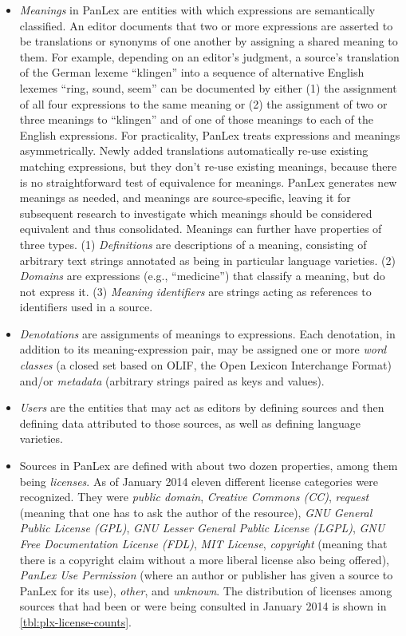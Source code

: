 \documentclass[sw]{iosart2c}
\begin{document}
\begin{itemize}
    \item \emph{Meanings} in PanLex are entities with which expressions are semantically classified. An editor documents that two or more expressions are asserted to be translations or synonyms of one another by assigning a shared meaning to them. For example, depending on an editor's judgment, a source's translation of the German lexeme ``klingen'' into a sequence of alternative English lexemes ``ring, sound, seem'' can be documented by either (1) the assignment of all four expressions to the same meaning or (2) the assignment of two or three meanings to ``klingen'' and of one of those meanings to each of the English expressions. For practicality, PanLex treats expressions and meanings asymmetrically. Newly added translations automatically re-use existing matching expressions, but they don't re-use existing meanings, because there is no straightforward test of equivalence for meanings. PanLex generates new meanings as needed, and meanings are source-specific, leaving it for subsequent research to investigate which meanings should be considered equivalent and thus consolidated. Meanings can further have properties of three types. (1) \emph{Definitions} are descriptions of a meaning, consisting of arbitrary text strings annotated as being in particular language varieties. (2) \emph{Domains} are expressions (e.g., ``medicine'') that classify a meaning, but do not express it. (3) \emph{Meaning identifiers} are strings acting as references to identifiers used in a source.
    \item \emph{Denotations} are assignments of meanings to expressions. Each denotation, in addition to its meaning-expression pair, may be assigned one or more \emph{word classes} (a closed set based on OLIF, the Open Lexicon Interchange Format) and/or \emph{metadata} (arbitrary strings paired as keys and values).
  \item \emph{Users} are the entities that may act as editors by defining sources and then defining data attributed to those sources, as well as defining language varieties.
  \item Sources in PanLex are defined with about two dozen properties, among them being \emph{licenses}. As of January 2014 eleven different license categories were recognized. They were \emph{public domain}, \emph{Creative Commons (CC)}, \emph{request} (meaning that one has to ask the author of the resource), \emph{GNU General Public License (GPL)}, \emph{GNU Lesser General Public License (LGPL)}, \emph{GNU Free Documentation License (FDL)}, \emph{MIT License}, \emph{copyright} (meaning that there is a copyright claim without a more liberal license also being offered), \emph{PanLex Use Permission} (where an author or publisher has given a source to PanLex for its use), \emph{other}, and \emph{unknown}.
    The distribution of licenses among sources that had been or were being consulted in January 2014 is shown in \autoref{tbl:plx-license-counts}.
\end{itemize}
\end{document}
